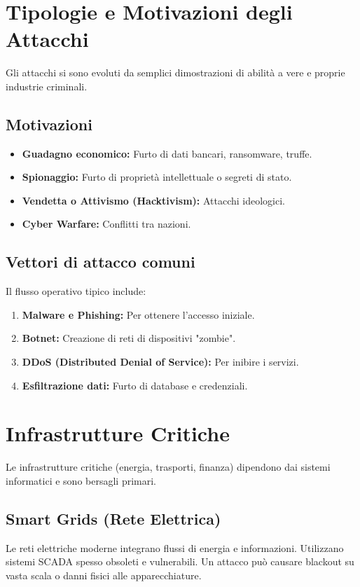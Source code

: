 \documentclass[a4paper,12pt]{article}
\begin{document}
\section{Tipologie e Motivazioni degli Attacchi}

Gli attacchi si sono evoluti da semplici dimostrazioni di abilità a vere e proprie industrie criminali. 

\subsection{Motivazioni}
\begin{itemize}
    \item \textbf{Guadagno economico:} Furto di dati bancari, ransomware, truffe.
    \item \textbf{Spionaggio:} Furto di proprietà intellettuale o segreti di stato.
    \item \textbf{Vendetta o Attivismo (Hacktivism):} Attacchi ideologici.
    \item \textbf{Cyber Warfare:} Conflitti tra nazioni.
\end{itemize}

\subsection{Vettori di attacco comuni}
Il flusso operativo tipico include:
\begin{enumerate}
    \item \textbf{Malware e Phishing:} Per ottenere l'accesso iniziale.
    \item \textbf{Botnet:} Creazione di reti di dispositivi "zombie".
    \item \textbf{DDoS (Distributed Denial of Service):} Per inibire i servizi.
    \item \textbf{Esfiltrazione dati:} Furto di database e credenziali.
\end{enumerate}

\section{Infrastrutture Critiche}

Le infrastrutture critiche (energia, trasporti, finanza) dipendono dai sistemi informatici e sono bersagli primari.

\subsection{Smart Grids (Rete Elettrica)}
Le reti elettriche moderne integrano flussi di energia e informazioni. Utilizzano sistemi SCADA spesso obsoleti e vulnerabili. Un attacco può causare blackout su vasta scala o danni fisici alle apparecchiature.
\end{document}
